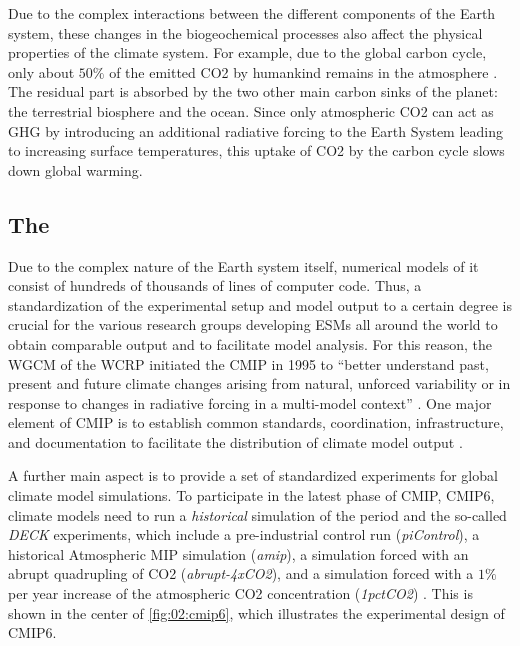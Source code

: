 Due to the complex interactions between the different components of the Earth
system, these changes in the biogeochemical processes also affect the physical
properties of the climate system. For example, due to the global carbon cycle,
only about $50 \unit{\%}$ of the emitted \ac{CO2} by humankind remains in the
atmosphere \autocite{Friedlingstein2020}. The residual part is absorbed by the
two other main carbon sinks of the planet: the terrestrial biosphere and the
ocean. Since only atmospheric \ac{CO2} can act as \ac{GHG} by introducing an
additional radiative forcing to the Earth System leading to increasing surface
temperatures, this uptake of \ac{CO2} by the carbon cycle slows down global
warming.


\subsection{The }
\label{subsec:02:cmip}

Due to the complex nature of the Earth system itself, numerical models of it
consist of hundreds of thousands of lines of computer code. Thus, a
standardization of the experimental setup and model output to a certain degree
is crucial for the various research groups developing \acp{ESM} all around the
world to obtain comparable output and to facilitate model analysis. For this
reason, the \ac{WGCM} of the \ac{WCRP} initiated the \acf{CMIP} in 1995 to
\enquote{better understand past, present and future climate changes arising
  from natural, unforced variability or in response to changes in radiative
  forcing in a multi-model context} \autocite{WCRP2020}. One major element of
\ac{CMIP} is to establish common standards, coordination, infrastructure, and
documentation to facilitate the distribution of climate model output
\autocite{Eyring2016, Juckes2020}.

A further main aspect is to provide a set of standardized experiments for
global climate model simulations. To participate in the latest phase of
\ac{CMIP}, \acs{CMIP}6, climate models need to run a \emph{historical}
simulation of the period  and the so-called \emph{\ac{DECK}}
experiments, which include a pre-industrial control run (\emph{piControl}), a
historical Atmospheric \ac{MIP} simulation (\emph{amip}), a simulation forced
with an abrupt quadrupling of \ac{CO2} (\emph{abrupt-4xCO2}), and a simulation
forced with a $1 \unit{\%}$ per year increase of the atmospheric \ac{CO2}
concentration (\emph{1pctCO2}) \autocite{Eyring2016}. This is shown in the
center of \cref{fig:02:cmip6}, which illustrates the experimental design of
\acs{CMIP}6.


